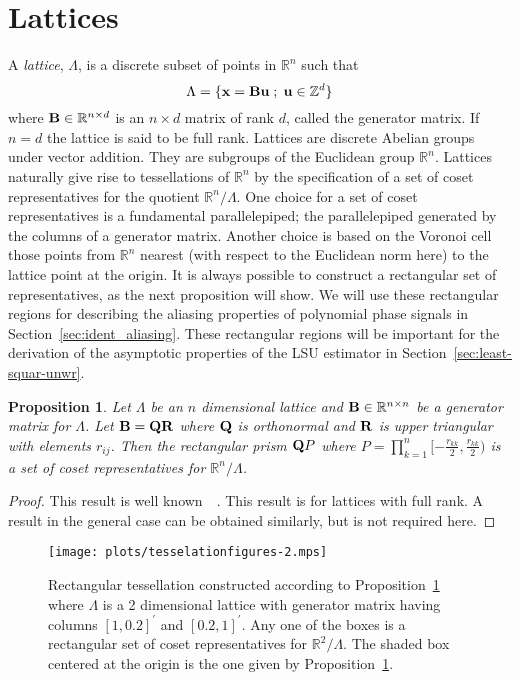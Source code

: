 \documentclass[aap]{imsart}
\newcommand{\reals}{{\mathbb R}}
\newcommand{\ints}{{\mathbb Z}}
\newcommand{\term}{\emph}
\renewcommand{\mid}{\; ; \;}
\newtheorem{proposition}{Proposition}
\begin{document}
\section{Lattices}\label{sec:lattice-theory}

A \term{lattice},  $\Lambda$, is a discrete subset of points in $\reals^n$ such that
\[
   \Lambda = \{\xbf = \Bbf\ubf \mid \ubf \in \ints^d \}
\]
where $\Bbf \in \reals^{n \times d}$ is an $n \times d$ matrix of rank $d$, called the generator matrix.  If $n = d$ the lattice is said to be full rank.  Lattices are discrete Abelian groups under vector addition.  They are subgroups of the Euclidean group $\reals^n$.  Lattices naturally give rise to tessellations of $\reals^n$ by the specification of a set of coset representatives for the quotient $\reals^n / \Lambda$.  One choice for a set of coset representatives is a fundamental parallelepiped; the parallelepiped generated by the columns of a generator matrix.  Another choice is based on the Voronoi cell those points from $\reals^n$ nearest (with respect to the Euclidean norm here) to the lattice point at the origin.  It is always possible to construct a rectangular set of representatives, as the next proposition will show.  We will use these rectangular regions for describing the aliasing properties of polynomial phase signals in Section~\ref{sec:ident_aliasing}.  These rectangular regions will be important for the derivation of the asymptotic properties of the LSU estimator in Section~\ref{sec:least-squar-unwr}.

\begin{proposition}\label{prop:lattice-theory-constructing_a_rectangular_tesselating_region}
Let  $\Lambda$ be an $n$ dimensional lattice and $\Bbf \in \reals^{n\times n}$ be a generator matrix for $\Lambda$. Let $\mathbf{B} = \mathbf{Q}\mathbf{R}$ where $\mathbf{Q}$ is orthonormal and $\mathbf{R}$ is upper triangular with elements $r_{ij}$.  Then the rectangular prism $\mathbf{Q} P$ where $P = \prod_{k=1}^{n}{[-\tfrac{r_{kk}}{2}, \frac{r_{kk}}{2})}$ is a set of coset representatives for $\reals^n / \Lambda$.
\end{proposition}
\begin{proof}
This result is well known~\cite[Chapter IX, Theorem IV]{Cassels_geom_numbers_1997}~\cite[Proposition 2.1]{McKilliam2010thesis}.  This result is for lattices with full rank.  A result in the general case can be obtained similarly, but is not required here.  
\end{proof}

\begin{figure}[t]
	\centering
		\texttt{[image: plots/tesselationfigures-2.mps]}
		\caption{Rectangular tessellation constructed according to Proposition~\ref{prop:lattice-theory-constructing_a_rectangular_tesselating_region} where $\Lambda$ is a 2 dimensional lattice with generator matrix having columns $[1, 0.2]^\prime$ and $[0.2, 1]^\prime$. Any one of the boxes is a rectangular set of coset representatives for $\reals^2 / \Lambda$.  The shaded box centered at the origin is the one given by Proposition~\ref{prop:lattice-theory-constructing_a_rectangular_tesselating_region}.}
		\label{lattices:fig:tessellation2}
\end{figure} 
\end{document}
